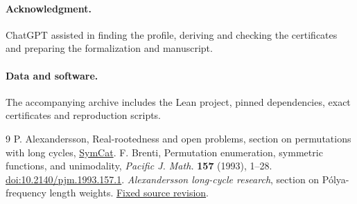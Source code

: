 \documentclass[11pt]{article}
\begin{document}
\paragraph{Acknowledgment.}
ChatGPT assisted in finding the profile, deriving and checking the
certificates and preparing the formalization and manuscript.
\paragraph{Data and software.} The accompanying archive includes the Lean project, pinned dependencies, exact certificates and reproduction scripts.\par
\begin{thebibliography}{9}
 P. Alexandersson, Real-rootedness and open problems, section on permutations with long cycles,
\href{https://www.symmetricfunctions.com/realRootedOpenProblems.htm\#permutations-with-long-cycles}{SymCat}.
 F. Brenti, Permutation enumeration, symmetric functions, and unimodality, \emph{Pacific J. Math.} \textbf{157} (1993), 1--28. \href{https://doi.org/10.2140/pjm.1993.157.1}{doi:10.2140/pjm.1993.157.1}.
 \emph{Alexandersson long-cycle research}, section on P\'olya-frequency length weights.
\href{https://github.com/1337isnot1337/solved-conjectures/blob/0c07434ef991b853528ca55926b3b83820b7f58d/docs/alexandersson-long-cycle-research.md}{Fixed source revision}.
\end{thebibliography}
\end{document}
